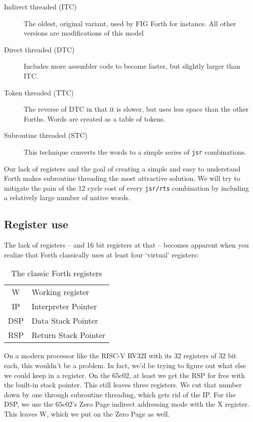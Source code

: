 \begin{description}
        \item [Indirect threaded (ITC)] The oldest, original variant, used by FIG
                Forth for instance. All other versions are
                modifications of this model
        \item [Direct threaded (DTC)] Includes more assembler code to become faster, but
                slightly larger than ITC. 
        \item [Token threaded (TTC)] The reverse of DTC in that it is slower, but uses
                less space than the other Forths. Words are created as a table
                of tokens.
        \item [Subroutine threaded (STC)] This technique converts the words to a simple
                series of \texttt{jsr} combinations. 
\end{description}

Our lack of registers and the goal of creating a simple and easy to understand
Forth makes subroutine threading the most attractive solution. We will try to
mitigate the pain of the 12 cycle cost of every \texttt{jsr/rts} combination by
including a relatively large number of native words. 


\subsection{Register use}

The lack of registers -- and 16 bit registers at that -- becomes apparent when
you realize that Forth classically uses at least four `virtual' registers:

\begin{table}[h !]
        \centering
        \label{tab:registers}
        \begin{tabular}{| c | l |}
                \hline
                W   & Working register\\
                IP  & Interpreter Pointer\\
                DSP & Data Stack Pointer\\
                RSP & Return Stack Pointer\\
                \hline
        \end{tabular}
        \caption{The classic Forth registers}
\end{table}

On a modern processor like the RISC-V RV32I with its 32 registers
of 32 bit each, this wouldn't be a problem. In fact, we'd be trying to figure
out what else we could keep in a register. On the 65c02, at least we get the RSP
for free with the built-in stack pointer. This still leaves three registers. We
cut that number down by one through subroutine threading, which gets rid of the
IP. For the DSP, we use the 65c02's Zero Page indirect
addressing mode with the X register. This leaves W, which we
put on the Zero Page as well. 


